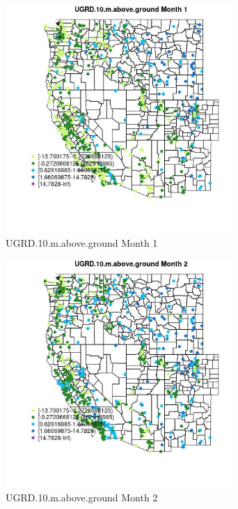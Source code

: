 \begin{figure} 
\centering  
\includegraphics[width=0.77\textwidth]{Code_Outputs/Report_ML_input_PM25_Step4_part_e_de_duplicated_aves_compiled_2019-05-21wNAs_MapObsMo1UGRD10maboveground.jpg} 
\caption{\label{fig:Report_ML_input_PM25_Step4_part_e_de_duplicated_aves_compiled_2019-05-21wNAsMapObsMo1UGRD10maboveground}UGRD.10.m.above.ground Month 1} 
\end{figure} 
 

\begin{figure} 
\centering  
\includegraphics[width=0.77\textwidth]{Code_Outputs/Report_ML_input_PM25_Step4_part_e_de_duplicated_aves_compiled_2019-05-21wNAs_MapObsMo2UGRD10maboveground.jpg} 
\caption{\label{fig:Report_ML_input_PM25_Step4_part_e_de_duplicated_aves_compiled_2019-05-21wNAsMapObsMo2UGRD10maboveground}UGRD.10.m.above.ground Month 2} 
\end{figure} 
 


